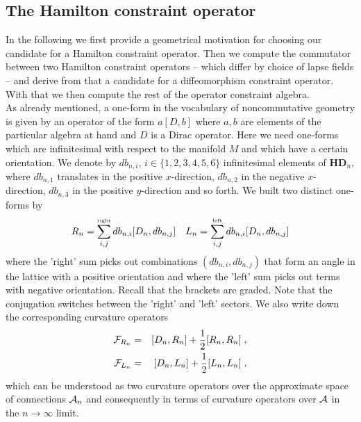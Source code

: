 \documentclass[12pt]{article}
\newcommand{\nn}{\nonumber}
\def\ca{{\cal A}}
\def\cf{{\cal F}}
\begin{document}
\subsection{The Hamilton constraint operator}



In the following we first provide a geometrical motivation for choosing our candidate for a Hamilton constraint operator. Then we compute the commutator between two Hamilton constraint operators -- which differ by choice of lapse fields -- and derive from that a candidate for a diffeomorphism constraint operator. With that we then compute the rest of the operator constraint algebra.\\










As already mentioned, a one-form in the vocabulary of noncommutative geometry is given by an operator of the form $ a [D,b]$ where $a,b$ are elements of the particular algebra at hand and $D$ is a Dirac operator. Here we need one-forms which are infinitesimal with respect to the manifold $M$ and which have a certain orientation. We denote by
$db_{n,i}$, $i\in\{1,2,3,4,5,6\}$ infinitesimal elements of $\mathbf{HD}_n$, where $db_{n,1}$ translates in the positive $x$-direction, $db_{n,2}$ in the negative $x$-direction, $db_{n,3}$ in the positive $y$-direction and so forth. We built two distinct one-forms by
\begin{eqnarray}
R_n = \sum_{i,j}^{\mbox{\tiny right}} db_{n,i} [D_n, db_{n,j}]      
&&
L_n =  \sum_{i,j}^{\mbox{\tiny left}}  db_{n,i} [D_n, db_{n,j}]    
\nn       
\end{eqnarray}
where the 'right' sum picks out combinations $(db_{n,i},db_{n,j})$ that form an angle in the lattice with a positive orientation and where the 'left' sum picks out terms with negative orientation. Recall that the brackets are graded. Note that the conjugation switches between the 'right' and 'left' sectors. 
%
We also write down the corresponding curvature operators
\begin{eqnarray}
\cf_{R_n}&=&  [D_n, R_n] + \frac{1}{2}[R_n,R_n] \;,
\nn\\ 
\cf_{L_n}&=& [D_n ,L_n] + \frac{1}{2}[L_n,L_n]  \;,
\nn
\end{eqnarray}
which can be understood as two curvature operators over the approximate space of connections $\ca_n$ and consequently in terms of curvature operators over $\ca$ in the $n\rightarrow\infty$ limit. 
\end{document}
